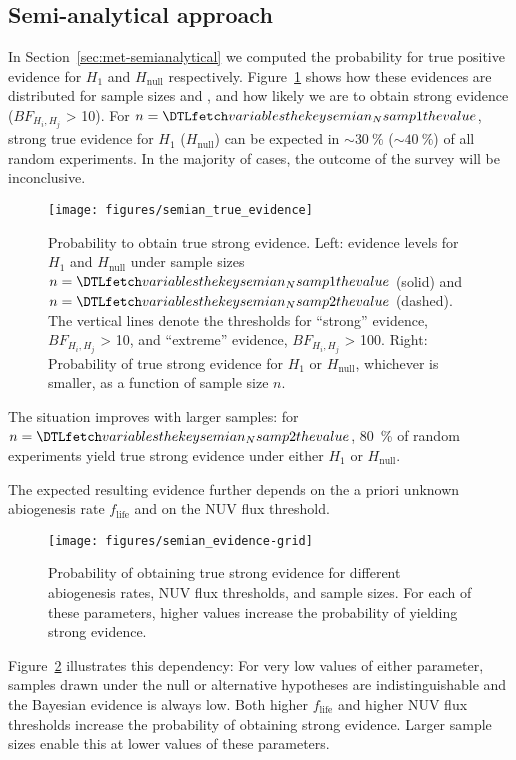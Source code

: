 \documentclass[modern,linenumbers]{aastex631}
\begin{document}
\subsection{Semi-analytical approach}
In Section~\ref{sec:met-semianalytical} we computed the probability for true positive evidence for $H_\mathrm{1}$ and $H_\mathrm{null}$ respectively.
Figure~\ref{fig:semian_true_evidence} shows how these evidences are distributed for sample sizes  and , and how likely we are to obtain strong evidence ($BF_{H_i, H_j}$ > 10).
For $n = \var{semian_Nsamp1}$, strong true evidence for $H_\mathrm{1}$ ($H_\mathrm{null}$) can be expected in $\sim \SI{30}{\percent}$ ($\sim \SI{40}{\percent}$) of all random experiments.
In the majority of cases, the outcome of the survey will be inconclusive.
\begin{figure*}
    \begin{centering}
        \texttt{[image: figures/semian\_true\_evidence]}
        \caption{Probability to obtain true strong evidence. Left: evidence levels for $H_\mathrm{1}$ and $H_\mathrm{null}$ under sample sizes $n = \var{semian_Nsamp1}$ (solid) and $n = \var{semian_Nsamp2}$ (dashed). The vertical lines denote the thresholds for ``strong'' evidence, $BF_{H_i, H_j}$ > 10, and ``extreme'' evidence, $BF_{H_i, H_j}$ > 100. Right: Probability of true strong evidence for $H_\mathrm{1}$ or $H_\mathrm{null}$, whichever is smaller, as a function of sample size $n$.}
        \label{fig:semian_true_evidence}
    \end{centering}
\end{figure*}
The situation improves with larger samples: for $n = \var{semian_Nsamp2}$, \SI{80}{\percent} of random experiments yield true strong evidence under either $H_\mathrm{1}$ or $H_\mathrm{null}$.

The expected resulting evidence further depends on the a priori unknown abiogenesis rate $f_\mathrm{life}$ and on the \gls{NUV} flux threshold.
\begin{figure*}
    \begin{centering}
        \texttt{[image: figures/semian\_evidence-grid]}
        \caption{Probability of obtaining true strong evidence for different abiogenesis rates, \gls{NUV} flux thresholds, and sample sizes. For each of these parameters, higher values increase the probability of yielding strong evidence.}
        \label{fig:semian_evidence-grid}
    \end{centering}
\end{figure*}
Figure~\ref{fig:semian_evidence-grid} illustrates this dependency: For very low values of either parameter, samples drawn under the null or alternative hypotheses are indistinguishable and the Bayesian evidence is always low.
Both higher $f_\mathrm{life}$ and higher \gls{NUV} flux thresholds increase the probability of obtaining strong evidence.
Larger sample sizes enable this at lower values of these parameters.
\end{document}
